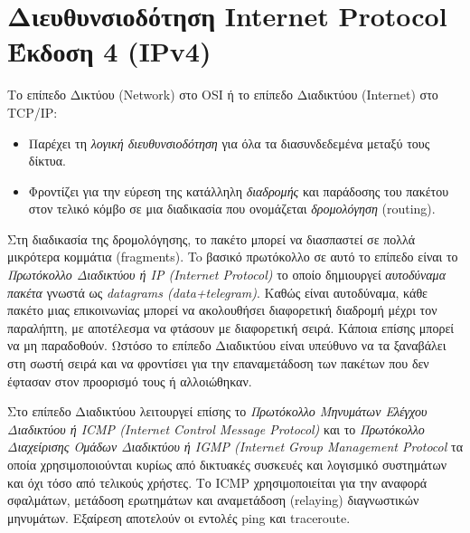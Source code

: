 %
%
\section{Διευθυνσιοδότηση Internet Protocol Έκδοση 4 (IPv4)}
Το επίπεδο Δικτύου (Network) στο OSI ή το επίπεδο Διαδικτύου (Internet) στο TCP/IP:

\begin{itemize}
\item Παρέχει τη \emph{λογική διευθυνσιοδότηση} για όλα τα διασυνδεδεμένα μεταξύ τους δίκτυα.
\item Φροντίζει για την εύρεση της κατάλληλη \emph{διαδρομής} και παράδοσης του πακέτου στον τελικό κόμβο σε μια διαδικασία που ονομάζεται \emph{δρομολόγηση} (routing).
\end{itemize}

Στη διαδικασία της δρομολόγησης, το πακέτο μπορεί να διασπαστεί σε πολλά μικρότερα κομμάτια (fragments).  To βασικό πρωτόκολλο σε αυτό το επίπεδο είναι το \emph{Πρωτόκολλο Διαδικτύου ή IP (Internet Protocol)} το οποίο δημιουργεί \emph{αυτοδύναμα πακέτα} γνωστά ως \emph{datagrams (data+telegram)}. Καθώς είναι αυτοδύναμα, κάθε πακέτο μιας επικοινωνίας μπορεί να ακολουθήσει διαφορετική διαδρομή μέχρι τον παραλήπτη, με αποτέλεσμα να φτάσουν με διαφορετική σειρά. Κάποια επίσης μπορεί να μη παραδοθούν. Ωστόσο το επίπεδο Διαδικτύου είναι υπεύθυνο να τα ξαναβάλει στη σωστή σειρά και να φροντίσει για την επαναμετάδοση των πακέτων που δεν έφτασαν στον προορισμό τους ή αλλοιώθηκαν.    

Στο επίπεδο Διαδικτύου λειτουργεί επίσης το \emph{Πρωτόκολλο Μηνυμάτων Ελέγχου Διαδικτύου ή ICMP (Internet Control Message Protocol)} και το \emph{Πρωτόκολλο Διαχείρισης Ομάδων Διαδικτύου ή IGMP (Internet Group Management Protocol} τα οποία χρησιμοποιούνται κυρίως από δικτυακές συσκευές και λογισμικό συστημάτων και όχι τόσο από τελικούς χρήστες. Το ICMP χρησιμοποιείται για την αναφορά σφαλμάτων, μετάδοση ερωτημάτων και αναμετάδοση (relaying) διαγνωστικών μηνυμάτων. Εξαίρεση αποτελούν οι εντολές ping και traceroute.

